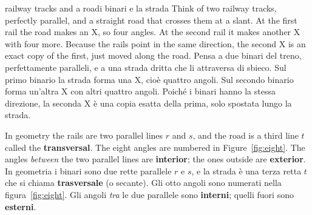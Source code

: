 \label{sec:parallel}
\begin{anchor}{railway tracks and a road}{i binari e la strada}
Think of two railway tracks, perfectly parallel, and a straight road that crosses them at a slant. At the first rail the road makes an X, so four angles. At the second rail it makes another X with four more. Because the rails point in the same direction, the second X is an exact copy of the first, just moved along the road.
\tcblower
Pensa a due binari del treno, perfettamente paralleli, e a una strada dritta che li attraversa di sbieco. Sul primo binario la strada forma una X, cioè quattro angoli. Sul secondo binario forma un'altra X con altri quattro angoli. Poiché i binari hanno la stessa direzione, la seconda X è una copia esatta della prima, solo spostata lungo la strada.
\end{anchor}

\begin{bi}
In geometry the rails are two parallel lines $r$ and $s$, and the road is a third line $t$ called the \textbf{transversal}. The eight angles are numbered in Figure~\ref{fig:eight}. The angles \emph{between} the two parallel lines are \textbf{interior}; the ones outside are \textbf{exterior}.
\IT
In geometria i binari sono due rette parallele $r$ e $s$, e la strada è una terza retta $t$ che si chiama \textbf{trasversale} (o secante). Gli otto angoli sono numerati nella figura~\ref{fig:eight}. Gli angoli \emph{tra} le due parallele sono \textbf{interni}; quelli fuori sono \textbf{esterni}.
\end{bi}

